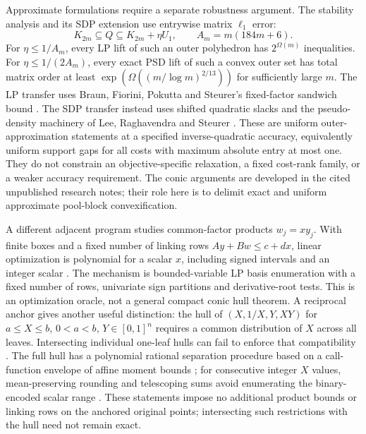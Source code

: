 Approximate formulations require a separate robustness argument.
The stability analysis \cite{s6:stability-note} and its SDP extension
\cite{s6:approx-sdp-note} use entrywise matrix $\ell_1$ error:
\[
 K_{2m}\subseteq Q\subseteq K_{2m}+\eta U_1,
 \qquad A_m=m(184m+6).
\]
For $\eta\le1/A_m$, every LP lift of such an outer polyhedron has
$2^{\Omega(m)}$ inequalities. For $\eta\le1/(2A_m)$, every exact
PSD lift of such a convex outer set has total matrix order at least
$\exp(\Omega((m/\log m)^{2/13}))$ for sufficiently large $m$.
The LP transfer uses Braun, Fiorini, Pokutta and Steurer's fixed-factor
sandwich bound \cite[Theorem~6]{s6:bfps2015}. The SDP transfer instead
uses shifted quadratic slacks and the pseudo-density machinery of
Lee, Raghavendra and Steurer
\cite[Theorem~3.8, equation~(3.11), and Theorem~5.3]{s6:lrs-full}. These are uniform outer-approximation
statements at a specified inverse-quadratic accuracy, equivalently
uniform support gaps for all costs with maximum absolute entry at most
one. They do not constrain an objective-specific relaxation, a fixed
cost-rank family, or a weaker accuracy requirement. The conic arguments
are developed in the cited unpublished research notes; their role here
is to delimit exact and uniform approximate pool-block convexification.

A different adjacent program studies common-factor products $w_j=xy_j$.
With finite boxes and a fixed number of linking rows
$Ay+Bw\le c+dx$, linear optimization is polynomial for a scalar $x$,
including signed intervals and an integer scalar
\cite{s6:common-factor-note}. The mechanism is bounded-variable LP
basis enumeration with a fixed number of rows, univariate sign
partitions and derivative-root tests. This is an optimization oracle,
not a general compact conic hull theorem. A reciprocal anchor gives
another useful distinction: the hull of
$(X,1/X,Y,XY)$ for $a\le X\le b$, $0<a<b$, $Y\in[0,1]^n$
requires a common distribution of $X$ across all leaves.
Intersecting individual one-leaf hulls can fail to enforce that
compatibility \cite{s6:anchor-faces-note}. The full hull has a
polynomial rational separation procedure based on a call-function
envelope of affine moment bounds \cite{s6:anchor-full-note}; for consecutive integer
$X$ values, mean-preserving rounding and telescoping sums avoid
enumerating the binary-encoded scalar range
\cite{s6:integer-anchor-note}. These statements impose no additional
product bounds or linking rows on the anchored original points;
intersecting such restrictions with the hull need not remain exact.

